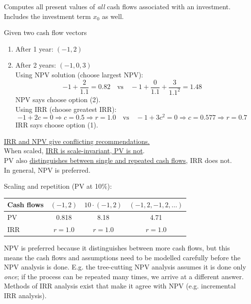 Computes all present values of \textit{all} cash flows associated with an investment. Includes the investment term $x_0$ as well.

\begin{example}
    Given two cash flow vectors
    \begin{enumerate}[label=(\arabic*)]
        \item After 1 year: $(-1,2)$
        \item After 2 years: $(-1,0, 3)$
        \\Using NPV solution (choose largest NPV):
        \[-1 + \frac{2}{1.1} = 0.82 \quad \text{vs} \quad -1 + \frac{0}{1.1} + \frac{3}{1.1^2} = 1.48\]
        NPV says choose option (2).
        \\Using IRR (choose greatest IRR):
        \[-1 + 2c = 0 \Rightarrow c = 0.5 \Rightarrow r = 1.0 \quad \text{vs} \quad -1+3c^2 = 0 \Rightarrow c = 0.577 \Rightarrow r = 0.7\]
        IRR says choose option (1).
    \end{enumerate}
\end{example}

\underline{IRR and NPV give conflicting recommendations.}
\\When scaled, \underline{IRR is scale-invariant, PV is not}. 
\\PV also \underline{distinguishes between single and repeated cash flows}, IRR does not.
\\In general, NPV is preferred.

\begin{example}
    Scaling and repetition (PV at 10\%):
    \begin{center}
    \begin{tabular}{lccc}
        \toprule
        Cash flows & $(-1,2)$ & $10\cdot(-1,2)$ & $(-1,2,-1,2,\dots)$\\
        \midrule
        PV & 0.818 & 8.18 & 4.71\\
        IRR & $r=1.0$ & $r=1.0$ & $r=1.0$\\
        \bottomrule
    \end{tabular}
    \end{center}
\end{example}

NPV is preferred because it distinguishes between more cash flows, but this means the cash flows and assumptions need to be modelled carefully before the NPV analysis is done. E.g. the tree-cutting NPV analysis assumes it is done only \textit{once}; if the process can be repeated many times, we arrive at a different answer. Methods of IRR analysis exist that make it agree with NPV (e.g. incremental IRR analysis).

